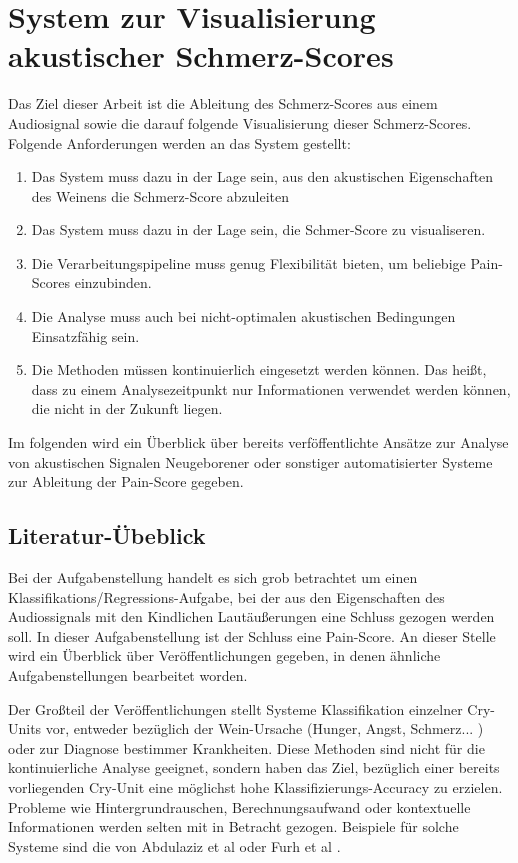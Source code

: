 \chapter{System zur Visualisierung akustischer Schmerz-Scores}


Das Ziel dieser Arbeit ist die Ableitung des Schmerz-Scores aus einem Audiosignal sowie die darauf folgende Visualisierung dieser Schmerz-Scores. Folgende Anforderungen werden an das System gestellt:
\begin{enumerate}
	\item Das System muss dazu in der Lage sein, aus den akustischen Eigenschaften des Weinens die Schmerz-Score abzuleiten
	\item Das System muss dazu in der Lage sein, die Schmer-Score zu visualiseren.
	\item Die Verarbeitungspipeline muss genug Flexibilität bieten, um beliebige Pain-Scores einzubinden. 
	\item Die Analyse muss auch bei nicht-optimalen akustischen Bedingungen Einsatzfähig sein.
	\item Die Methoden müssen kontinuierlich eingesetzt werden können. Das heißt, dass zu einem Analysezeitpunkt nur Informationen verwendet werden können, die nicht in der Zukunft liegen.
\end{enumerate}

Im folgenden wird ein Überblick über bereits verföffentlichte Ansätze zur Analyse von akustischen Signalen Neugeborener oder sonstiger automatisierter Systeme zur Ableitung der Pain-Score gegeben.

\section{Literatur-Übeblick}
\label{sec:system_literature}

Bei der Aufgabenstellung handelt es sich grob betrachtet um einen Klassifikations/Regressions-Aufgabe, bei der aus den Eigenschaften des Audiossignals mit den Kindlichen Lautäußerungen eine Schluss gezogen werden soll. In dieser Aufgabenstellung ist der Schluss eine Pain-Score. An dieser Stelle wird ein Überblick über Veröffentlichungen gegeben, in denen ähnliche Aufgabenstellungen bearbeitet worden.

Der Großteil der Veröffentlichungen stellt Systeme Klassifikation einzelner Cry-Units vor, entweder bezüglich der Wein-Ursache (Hunger, Angst, Schmerz... ) oder zur Diagnose bestimmer Krankheiten. Diese Methoden sind nicht für die kontinuierliche Analyse geeignet, sondern haben das Ziel, bezüglich einer bereits vorliegenden Cry-Unit eine möglichst hohe Klassifizierungs-Accuracy zu erzielen. Probleme wie Hintergrundrauschen, Berechnungsaufwand oder kontextuelle Informationen werden selten mit in Betracht gezogen. Beispiele für solche Systeme sind die von Abdulaziz et al \cite{class_abdulaziz} oder Furh et al \cite{comparisonOfLearning}.

